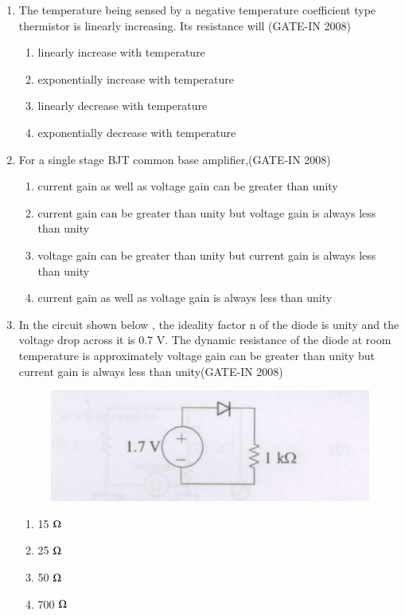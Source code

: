 \documentclass[journal,12pt,onecolumn]{IEEEtran}
\theoremstyle{remark}
\begin{document}
\begin{enumerate}
    \item The temperature being sensed by a negative temperature coefficient  type thermistor is linearly increasing. Its resistance will \hfill{(GATE-IN 2008)}
    \begin{multicols}{2}
    \begin{enumerate} 
        \item linearly increase with temperature
        \item exponentially increase with temperature 
        \item linearly decrease with temperature
        \item exponentially decrease with temperature
    \end{enumerate}
    \end{multicols}
    
    \item For a single stage BJT common base amplifier,\hfill{(GATE-IN 2008)}
    \begin{enumerate} 
        \item current gain as well as voltage gain can be greater than unity
        \item current gain can be greater than unity but voltage gain is always less than unity 
        \item voltage gain can be greater than unity but current gain is always less than unity 
        \item current gain as well as voltage gain is always less than unity
    \end{enumerate}
    
    \item In the circuit shown below , the ideality factor n of the diode is unity and the voltage drop across it
is 0.7 V. The dynamic resistance of the diode at room temperature is approximately  voltage gain can be greater than unity but current gain is always less than unity\hfill{(GATE-IN 2008)}

 \begin{figure}[H]
    \centering
    \includegraphics[width=0.5\columnwidth]{figs/i3.jpg}
    \caption{}
    \label{fig:placeholder3}
\end{figure}
\begin{multicols}{4}
    \begin{enumerate} 
        \item 15 $\ohm$
        \item 25 $\ohm$
        \item 50 $\ohm$
        \item 700 $\ohm$
    \end{enumerate}
    \end{multicols}
    

\end{enumerate}
\end{document}

